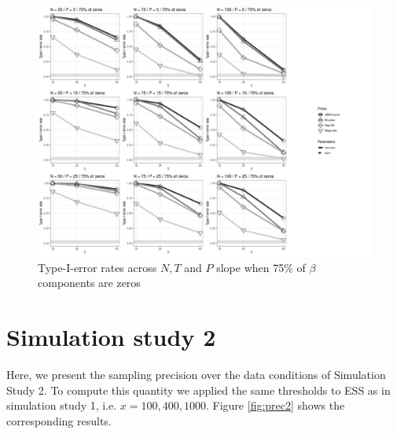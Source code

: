 \documentclass[a4paper,12pt]{article}
\begin{document}
\begin{figure}[]\label{fig:NDR_nz25}
\centering 
\includegraphics[width=18cm]{NDR_nz25_beta.jpg}
\caption{Type-I-error rates across $N, T$ and $P$ slope when 75\% of $\beta$ components are zeros}
\end{figure}

\clearpage
\section{Simulation study 2}

Here, we present the sampling precision over the data conditions of Simulation Study 2. To compute this quantity we applied the same thresholds to ESS as in simulation study 1, i.e. $x=100,400,1000$. Figure \ref{fig:prec2} shows the corresponding results. 

\end{document}
